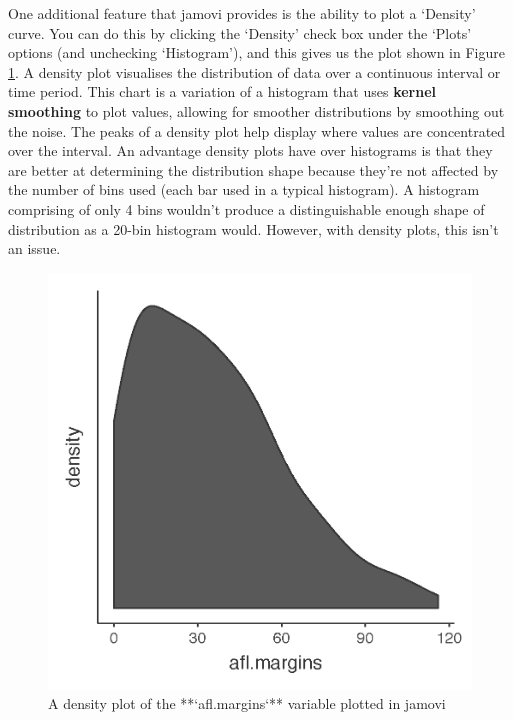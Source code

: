 \documentclass[
]{book}
\begin{document}
One additional feature that jamovi provides is the ability to plot a `Density' curve. You can do this by clicking the `Density' check box under the `Plots' options (and unchecking `Histogram'), and this gives us the plot shown in Figure \ref{fig:histogram2}. A density plot visualises the distribution of data over a continuous interval or time period. This chart is a variation of a histogram that uses {\textbf{kernel smoothing}} to plot values, allowing for smoother distributions by smoothing out the noise. The peaks of a density plot help display where values are concentrated over the interval. An advantage density plots have over histograms is that they are better at determining the distribution shape because they're not affected by the number of bins used (each bar used in a typical histogram). A histogram comprising of only 4 bins wouldn't produce a distinguishable enough shape of distribution as a 20-bin histogram would. However, with density plots, this isn't an issue.

\begin{figure}

{\centering \includegraphics[width=1\linewidth]{img/graphics/histogram2} 

}

\caption{A density plot of the **`afl.margins`** variable plotted in jamovi}\label{fig:histogram2}
\end{figure}
\end{document}
